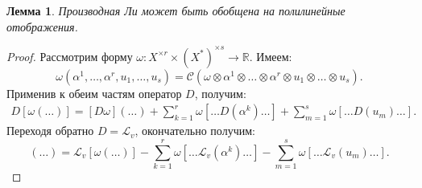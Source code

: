 \documentclass[12pt]{article}
\theoremstyle{plain}
\theoremstyle{lemma}
\newtheorem{lemma}{Лемма}
\theoremstyle{corollary}
\theoremstyle{proposition}
\theoremstyle{exercise}
\theoremstyle{example}
\theoremstyle{remark}
\theoremstyle{definition}
\newcommand\mb{\mathbb}
\begin{document}
\begin{lemma}
    Производная Ли может быть обобщена на полилинейные отображения.
\end{lemma}

\begin{proof}
    Рассмотрим форму $\omega: X^{\times r} \times (X^\ast)^{\times s} \to \mb R$. Имеем:
    \begin{equation*}
        \omega(\alpha^1, \ldots, \alpha^r, u_1, \ldots, u_s) = 
        \mathcal{C}(\omega \otimes \alpha^1 \otimes \ldots  \otimes \alpha^r \otimes u_1 \otimes \ldots \otimes u_s).
    \end{equation*}
    Применив к обеим частям оператор $D$, получим:
    \begin{gather*}
        D[\omega(\ldots)] = [D\omega](\ldots) + \sum_{k=1}^{r} \omega[\ldots D(\alpha^k) \ldots] + 
        \sum_{m=1}^{s} \omega[\ldots D(u_m) \ldots].
    \end{gather*}
    Переходя обратно $D = \mathcal{L}_v$, окончательно получим:
    \begin{equation*}
        [\mathcal{L}_v(\omega)](\ldots) = \mathcal{L}_v[\omega(\ldots)] - 
        \sum_{k=1}^{r} \omega[\ldots \mathcal{L}_v(\alpha^k) \ldots] - 
        \sum_{m=1}^{s} \omega[\ldots \mathcal{L}_v(u_m) \ldots].
    \end{equation*}
\end{proof}
\end{document}
